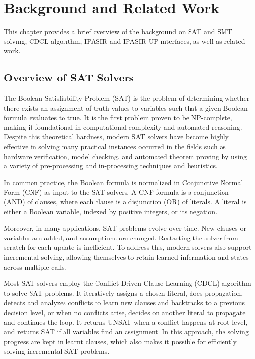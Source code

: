 \chapter{Background and Related Work}

This chapter provides a brief overview of the background on SAT and SMT solving, CDCL algorithm, IPASIR and IPASIR-UP interfaces, as well as related work.

\section{Overview of SAT Solvers}

The Boolean Satisfiability Problem (SAT) is the problem of determining whether there exists an assignment of truth values to variables such that a given Boolean formula evaluates to true. It is the first problem proven to be NP-complete, making it foundational in computational complexity and automated reasoning. Despite this theoretical hardness, modern SAT solvers have become highly effective in solving many practical instances occurred in the fields such as hardware verification, model checking, and automated theorem proving by using a variety of pre-processing and in-processing techniques and heuristics.

In common practice, the Boolean formula is normalized in Conjunctive Normal Form (CNF) as input to the SAT solvers. A CNF formula is a conjunction (AND) of clauses, where each clause is a disjunction (OR) of literals. A literal is either a Boolean variable, indexed by positive integers, or its negation.

Moreover, in many applications, SAT problems evolve over time. New clauses or variables are added, and assumptions are changed. Restarting the solver from scratch for each update is inefficient. To address this, modern solvers also support incremental solving, allowing themselves to retain learned information and states across multiple calls.

Most SAT solvers employ the Conflict-Driven Clause Learning (CDCL) algorithm to solve SAT problems. It iteratively assigns a chosen literal, does propagation, detects and analyzes conflicts to learn new clauses and backtracks to a previous decision level, or when no conflicts arise, decides on another literal to propagate and continues the loop. It returns UNSAT when a conflict happens at root level, and returns SAT if all variables find an assignment. In this approach, the solving progress are kept in learnt clauses, which also makes it possible for efficiently solving incremental SAT problems.

